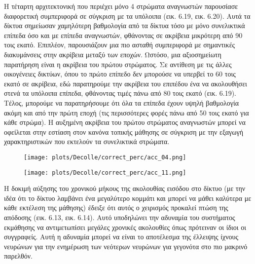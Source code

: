 \documentclass[12pt]{report}
\begin{document}
Η τέταρτη αρχιτεκτονική που περιέχει μόνο 4 στρώματα αναγνωστών παρουσίασε διαφορετική συμπεριφορά σε σύγκριση με τα υπόλοιπα (εικ. 6.19, εικ. 6.20). Αυτά τα δίκτυα σημείωσαν χαμηλότερη βαθμολογία από τα δίκτυα τόσο με μόνο συνελικτικά επίπεδα όσο και με επίπεδα αναγνωστών, φθάνοντας σε ακρίβεια μικρότερη από 90 τοις εκατό. Επιπλέον, παρουσιάζουν μια πιο ασταθή συμπεριφορά με σημαντικές διακυμάνσεις στην ακρίβεια μεταξύ των εποχών. Ωστόσο, μια αξιοσημείωτη παρατήρηση είναι η ακρίβεια του πρώτου στρώματος. Σε αντίθεση με τις άλλες οικογένειες δικτύων, όπου το πρώτο επίπεδο δεν μπορούσε να υπερβεί το 60 τοις εκατό σε ακρίβεια, εδώ παρατηρούμε την ακρίβεια του επιπέδου ένα να ακολουθήσει στενά τα υπόλοιπα επίπεδα, φθάνοντας τιμές πάνω από 80 τοις εκατό (εικ. 6.19). Τέλος, μπορούμε να παρατηρήσουμε ότι όλα τα επίπεδα έχουν υψηλή βαθμολογία ακόμη και από την πρώτη εποχή (τις περισσότερες φορές πάνω από 50 τοις εκατό για κάθε στρώμα). Η αυξημένη ακρίβεια του πρώτου στρώματος αναγνωστών μπορεί να οφείλεται στην εστίαση στον κανόνα τοπικής μάθησης σε σύγκριση με την εξαγωγή χαρακτηριστικών που εκτελούν τα συνελικτικά στρώματα.

\begin{figure}
\centering
\begin{minipage}{.4\textwidth}
  \centering
  \texttt{[image: plots/Decolle/correct\_perc/acc\_04.png]}
  \label{fig:test1}
\end{minipage}
\begin{minipage}{.4\textwidth}
  \centering
  \texttt{[image: plots/Decolle/correct\_perc/acc\_11.png]}
  \label{fig:test2}
\end{minipage}
\end{figure}

Η δοκιμή αύξησης του χρονικού μήκους της ακολουθίας εισόδου στο δίκτυο (με την ιδέα ότι το δίκτυο λαμβάνει ένα μεγαλύτερο κομμάτι και μπορεί να μάθει καλύτερα με κάθε εκτέλεση της μάθησης) έδειξε ότι αυτός ο χειρισμός προκαλεί πτώση της απόδοσης (εικ. 6.13, εικ. 6.14). Αυτό υποδηλώνει την αδυναμία του συστήματος εκμάθησης να αντιμετωπίσει μεγάλες χρονικές ακολουθίες όπως πρότειναν οι ίδιοι οι συγγραφείς. Αυτή η αδυναμία μπορεί να είναι το αποτέλεσμα της έλλειψης ίχνους νευρώνων για την ενημέρωση των νεότερων νευρώνων για γεγονότα στο πιο μακρινό παρελθόν.
\end{document}
